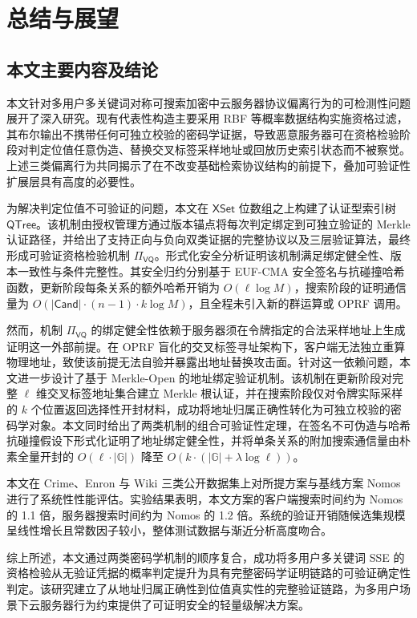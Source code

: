 \chapter{总结与展望}

\section{本文主要内容及结论}

本文针对多用户多关键词对称可搜索加密中云服务器协议偏离行为的可检测性问题展开了深入研究。现有代表性构造主要采用 RBF 等概率数据结构实施资格过滤，其布尔输出不携带任何可独立校验的密码学证据，导致恶意服务器可在资格检验阶段对判定位值任意伪造、替换交叉标签采样地址或回放历史索引状态而不被察觉。上述三类偏离行为共同揭示了在不改变基础检索协议结构的前提下，叠加可验证性扩展层具有高度的必要性。

为解决判定位值不可验证的问题，本文在 $\mathsf{XSet}$ 位数组之上构建了认证型索引树 $\mathsf{QTree}$。该机制由授权管理方通过版本锚点将每次判定绑定到可独立验证的 Merkle 认证路径，并给出了支持正向与负向双类证据的完整协议以及三层验证算法，最终形成可验证资格检验机制 $\Pi_{\mathsf{VQ}}$。形式化安全分析证明该机制满足绑定健全性、版本一致性与条件完整性。其安全归约分别基于 EUF-CMA 安全签名与抗碰撞哈希函数，更新阶段每条关系的额外哈希开销为 $O(\ell \log M)$，搜索阶段的证明通信量为 $O(|\mathsf{Cand}| \cdot (n-1) \cdot k \log M)$，且全程未引入新的群运算或 OPRF 调用。

然而，机制 $\Pi_{\mathsf{VQ}}$ 的绑定健全性依赖于服务器须在令牌指定的合法采样地址上生成证明这一外部前提。在 OPRF 盲化的交叉标签寻址架构下，客户端无法独立重算物理地址，致使该前提无法自验并暴露出地址替换攻击面。针对这一依赖问题，本文进一步设计了基于 Merkle-Open 的地址绑定验证机制。该机制在更新阶段对完整 $\ell$ 维交叉标签地址集合建立 Merkle 根认证，并在搜索阶段仅对令牌实际采样的 $k$ 个位置返回选择性开封材料，成功将地址归属正确性转化为可独立校验的密码学对象。本文同时给出了两类机制的组合可验证性定理，在签名不可伪造与哈希抗碰撞假设下形式化证明了地址绑定健全性，并将单条关系的附加搜索通信量由朴素全量开封的 $O(\ell \cdot |\mathbb{G}|)$ 降至 $O(k \cdot (|\mathbb{G}| + \lambda \log \ell))$。

本文在 Crime、Enron 与 Wiki 三类公开数据集上对所提方案与基线方案 Nomos 进行了系统性性能评估。实验结果表明，本文方案的客户端搜索时间约为 Nomos 的 1.1 倍，服务器搜索时间约为 Nomos 的 1.2 倍。系统的验证开销随候选集规模呈线性增长且常数因子较小，整体测试数据与渐近分析高度吻合。

综上所述，本文通过两类密码学机制的顺序复合，成功将多用户多关键词 SSE 的资格检验从无验证凭据的概率判定提升为具有完整密码学证明链路的可验证确定性判定。该研究建立了从地址归属正确性到位值真实性的完整验证链路，为多用户场景下云服务器行为约束提供了可证明安全的轻量级解决方案。

